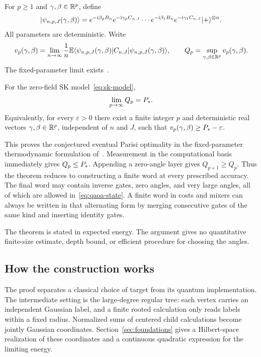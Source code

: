 For $p\ge1$ and $\gamma,\beta\in\mathbb R^p$, define
\begin{equation}\label{eq:qaoa-state}
 \lvert \psi_{n,p,J}(\gamma,\beta)\rangle
 =e^{-\mathrm i\beta_pB_n}e^{-\mathrm i\gamma_pC_{n,J}}
 \cdots e^{-\mathrm i\beta_1B_n}e^{-\mathrm i\gamma_1C_{n,J}}
 \lvert +\rangle^{\otimes n}.
\end{equation}
All parameters are deterministic. Write
\begin{equation}\label{eq:qaoa-value}
 v_p(\gamma,\beta)=\lim_{n\to\infty}\frac1n
 \mathbb E\langle \psi_{n,p,J}(\gamma,\beta)\rvert C_{n,J}
 \lvert \psi_{n,p,J}(\gamma,\beta)\rangle,
 \qquad Q_p=\sup_{\gamma,\beta\in\mathbb R^p}v_p(\gamma,\beta).
\end{equation}
The fixed-parameter limit exists~\cite{FGGZ2022,BFMVZ2022}.

\begin{theorem}\label{thm:main}
For the zero-field SK model~\eqref{eq:sk-model},
\begin{equation}\label{eq:main-result}
 \lim_{p\to\infty}Q_p=P_*.
\end{equation}
Equivalently, for every $\varepsilon>0$ there exist a finite integer $p$ and
deterministic real vectors $\gamma,\beta\in\mathbb R^p$, independent of $n$ and $J$,
such that $v_p(\gamma,\beta)\ge P_*-\varepsilon$.
\end{theorem}

This proves the conjectured eventual Parisi optimality in the
fixed-parameter thermodynamic formulation of~\cite{BFMVZ2022}.
Measurement in the computational basis immediately gives $Q_p\le P_*$.
Appending a zero-angle layer gives $Q_{p+1}\ge Q_p$. Thus the theorem reduces
to constructing a finite word at every prescribed accuracy. The final word
may contain inverse gates, zero angles, and very large angles, all of which
are allowed in~\eqref{eq:qaoa-state}. A finite word in costs and mixers can
always be written in that alternating form by merging consecutive gates of
the same kind and inserting identity gates.

The theorem is stated in expected energy. The argument gives no
quantitative finite-size estimate, depth bound, or efficient procedure
for choosing the angles.

\subsection{How the construction works}

The proof separates a classical choice of target from its quantum
implementation. The intermediate setting is the large-degree
regular tree: each vertex carries an independent Gaussian label,
and a finite rooted calculation only reads labels within a fixed
radius. Normalized sums of centered child calculations become
jointly Gaussian coordinates. Section~\ref{sec:foundations} gives a
Hilbert-space realization of these coordinates and a continuous
quadratic expression for the limiting energy.

